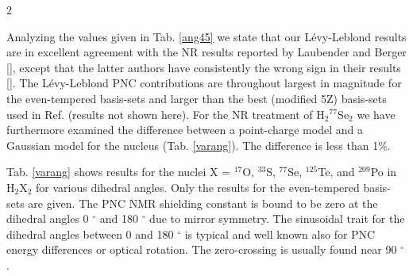 \documentclass[a4paper,12pt,english]{article}
\begin{document}
\begin{spacing}{2}
\par Analyzing the values given in Tab. \ref{ang45} we state that our L\'evy-Leblond results are in excellent agreement with the NR results reported by Laubender and Berger [\cite{berger2003chemphyschem}], except that the latter authors have consistently the wrong sign in their results [\cite{bergercomm}]. The L\'evy-Leblond PNC contributions are throughout largest in magnitude for the even-tempered basis-sets and larger than the best (modified 5Z) basis-sets used in Ref. \cite{berger2003chemphyschem} (results not shown here). For the NR treatment of H$_2{^{77}}$Se$_2$ we have furthermore examined the difference between a point-charge model and a Gaussian model for the nucleus (Tab. \ref{varang}). The difference is less than 1\%. 
\par Tab. \ref{varang} shows results for the nuclei X = $^{17}$O, $^{33}$S, $^{77}$Se, $^{125}$Te, and $^{209}$Po in H$_2$X$_2$ for various dihedral angles. Only the results for the even-tempered basis-sets are given. The PNC NMR shielding constant is bound to be zero at the dihedral angles 0 $^\circ$ and 180 $^\circ$ due to mirror symmetry. The sinusoidal trait for the dihedral angles between 0 and 180 $^\circ$ is typical and well known also for PNC energy differences or optical rotation. The zero-crossing is usually found near 90 $^\circ$. 



\end{spacing}
\end{document}

